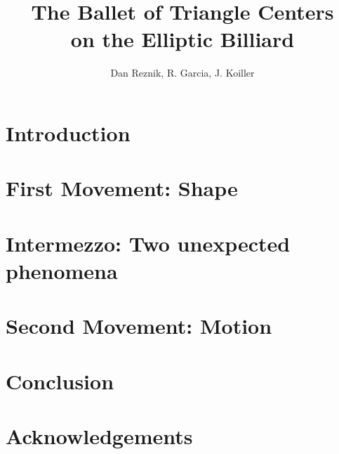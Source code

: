 \documentclass{amsart}
\begin{document}
\title{The Ballet of Triangle Centers\\on the Elliptic Billiard}
   
\author{Dan Reznik, R. Garcia, J. Koiller} 
  


\section{Introduction}
\label{sec:intro}


\section{First Movement: Shape}
\label{sec:act-I}


\section{Intermezzo: Two unexpected phenomena}
\label{sec:intermezzo}


\section{Second Movement: Motion}
\label{sec:act-II}


\section{Conclusion}
\label{sec:conclusion}


\section*{Acknowledgements}





\appendix

\end{document}
